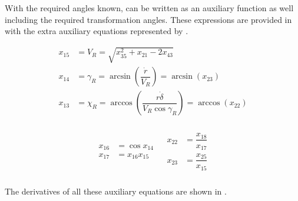 With the required angles known,  can be written as an auxiliary function as well including the required transformation angles. These expressions are provided in  with the extra auxiliary equations represented by .

 \begin{equation} \label{eq:rotTransAnglAux}
\begin{split}
x_{15} &= V_{R} = \sqrt{x_{35}^{2}+x_{21}-2x_{43}}\\
x_{14} &= \gamma_{R} = \arcsin\left(\dfrac{\dot{r}}{V_{R}}\right) = \arcsin\left(x_{23}\right)\\
x_{13} &= \chi_{R} = \arccos\left(\dfrac{r \dot{\delta}}{V_{R} \cos \gamma_{R}}\right)=\arccos\left(x_{22}\right)\\
\end{split}
\end{equation} 

 
 \begin{align} \label{eq:rotExtraTransAnglAux}
\begin{split}
x_{16} &= \cos x_{14}\\
x_{17} &= x_{16}x_{15}\\
\end{split}
&
\begin{split}
x_{22} &= \dfrac{x_{18}}{x_{17}}\\
x_{23} &= \dfrac{x_{25}}{x_{15}}\\
\end{split}
\end{align}  

The derivatives of all these auxiliary equations are shown in .

